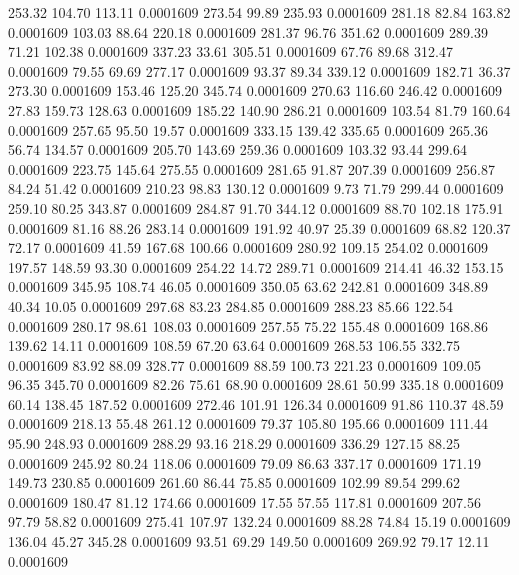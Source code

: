  253.32  104.70  113.11   0.0001609
 273.54   99.89  235.93   0.0001609
 281.18   82.84  163.82   0.0001609
 103.03   88.64  220.18   0.0001609
 281.37   96.76  351.62   0.0001609
 289.39   71.21  102.38   0.0001609
 337.23   33.61  305.51   0.0001609
  67.76   89.68  312.47   0.0001609
  79.55   69.69  277.17   0.0001609
  93.37   89.34  339.12   0.0001609
 182.71   36.37  273.30   0.0001609
 153.46  125.20  345.74   0.0001609
 270.63  116.60  246.42   0.0001609
  27.83  159.73  128.63   0.0001609
 185.22  140.90  286.21   0.0001609
 103.54   81.79  160.64   0.0001609
 257.65   95.50   19.57   0.0001609
 333.15  139.42  335.65   0.0001609
 265.36   56.74  134.57   0.0001609
 205.70  143.69  259.36   0.0001609
 103.32   93.44  299.64   0.0001609
 223.75  145.64  275.55   0.0001609
 281.65   91.87  207.39   0.0001609
 256.87   84.24   51.42   0.0001609
 210.23   98.83  130.12   0.0001609
   9.73   71.79  299.44   0.0001609
 259.10   80.25  343.87   0.0001609
 284.87   91.70  344.12   0.0001609
  88.70  102.18  175.91   0.0001609
  81.16   88.26  283.14   0.0001609
 191.92   40.97   25.39   0.0001609
  68.82  120.37   72.17   0.0001609
  41.59  167.68  100.66   0.0001609
 280.92  109.15  254.02   0.0001609
 197.57  148.59   93.30   0.0001609
 254.22   14.72  289.71   0.0001609
 214.41   46.32  153.15   0.0001609
 345.95  108.74   46.05   0.0001609
 350.05   63.62  242.81   0.0001609
 348.89   40.34   10.05   0.0001609
 297.68   83.23  284.85   0.0001609
 288.23   85.66  122.54   0.0001609
 280.17   98.61  108.03   0.0001609
 257.55   75.22  155.48   0.0001609
 168.86  139.62   14.11   0.0001609
 108.59   67.20   63.64   0.0001609
 268.53  106.55  332.75   0.0001609
  83.92   88.09  328.77   0.0001609
  88.59  100.73  221.23   0.0001609
 109.05   96.35  345.70   0.0001609
  82.26   75.61   68.90   0.0001609
  28.61   50.99  335.18   0.0001609
  60.14  138.45  187.52   0.0001609
 272.46  101.91  126.34   0.0001609
  91.86  110.37   48.59   0.0001609
 218.13   55.48  261.12   0.0001609
  79.37  105.80  195.66   0.0001609
 111.44   95.90  248.93   0.0001609
 288.29   93.16  218.29   0.0001609
 336.29  127.15   88.25   0.0001609
 245.92   80.24  118.06   0.0001609
  79.09   86.63  337.17   0.0001609
 171.19  149.73  230.85   0.0001609
 261.60   86.44   75.85   0.0001609
 102.99   89.54  299.62   0.0001609
 180.47   81.12  174.66   0.0001609
  17.55   57.55  117.81   0.0001609
 207.56   97.79   58.82   0.0001609
 275.41  107.97  132.24   0.0001609
  88.28   74.84   15.19   0.0001609
 136.04   45.27  345.28   0.0001609
  93.51   69.29  149.50   0.0001609
 269.92   79.17   12.11   0.0001609
